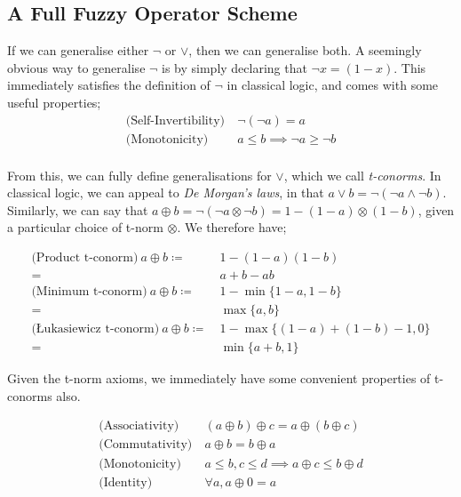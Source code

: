 \documentclass[conference]{report}
\begin{document}
\subsection{A Full Fuzzy Operator Scheme}

If we can generalise either $\lnot$ or $\lor$, then we can generalise both. A seemingly obvious way to generalise $\lnot$ is by simply declaring that $\lnot x = (1 - x)$. This immediately satisfies the definition of $\lnot$ in classical logic, and comes with some useful properties;
$$
\begin{aligned}
\text{(Self-Invertibility)}&\ \lnot(\lnot a) = a \\
\text{(Monotonicity)}&\ a \leq b \implies \lnot a \geq \lnot b \\
\end{aligned}
$$

From this, we can fully define generalisations for $\lor$, which we call \textit{t-conorms}. In classical logic, we can appeal to \textit{De Morgan's laws}, in that $a \lor b = \lnot (\lnot a \land \lnot b)$. Similarly, we can say that $a \oplus b = \lnot(\lnot a \otimes \lnot b) = 1 - (1 - a) \otimes (1 - b)$, given a particular choice of t-norm $\otimes$. We therefore have;

$$
\begin{aligned}
    \text{(Product t-conorm)}\ a \oplus b \coloneqq &\ 1 - (1-a)(1-b) \\
    = &\ a + b - ab \\
    \text{(Minimum t-conorm)}\ a \oplus b \coloneqq &\ 1 - \min\{1-a,1-b\} \\
    = &\ \max\{a, b\} \\
    \text{(Łukasiewicz t-conorm)}\ a \oplus b \coloneqq &\ 1 - \max\{(1-a)+(1-b)-1,0\} \\
    = &\ \min\{a+b, 1\}
\end{aligned}
$$

Given the t-norm axioms, we immediately have some convenient properties of t-conorms also.

$$
\begin{aligned}
\text{(Associativity)}&\ (a \oplus b) \oplus c = a \oplus (b \oplus c) \\
\text{(Commutativity)}&\ a \oplus b = b \oplus a \\
\text{(Monotonicity)}&\ a \leq b, c \leq d \implies a \oplus c \leq b \oplus d \\
\text{(Identity)}&\ \forall a, a \oplus 0 = a
\end{aligned}
$$
\end{document}
